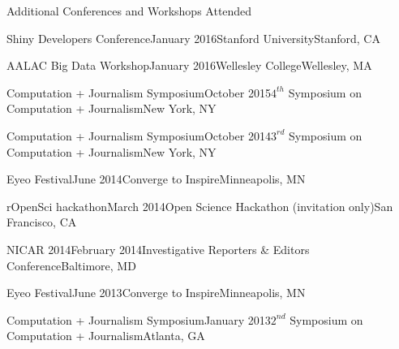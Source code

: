 \documentclass{resume} %
\begin{document}

\begin{rSection}{Additional Conferences and Workshops Attended}

\begin{sSubsection}{Shiny Developers Conference}{}{January 2016}{Stanford University}{Stanford, CA}
\end{sSubsection}

\begin{sSubsection}{AALAC Big Data Workshop}{}{January 2016}{Wellesley College}{Wellesley, MA}
\end{sSubsection}

\begin{sSubsection}{Computation + Journalism Symposium}{}{October 2015}{$4^{th}$ Symposium on Computation + Journalism}{New York, NY}
\end{sSubsection}

\begin{sSubsection}{Computation + Journalism Symposium}{}{October 2014}{$3^{rd}$ Symposium on Computation + Journalism}{New York, NY}
\end{sSubsection}

\begin{sSubsection}{Eyeo Festival}{}{June 2014}{Converge to Inspire}{Minneapolis, MN}
\end{sSubsection}

\begin{sSubsection}{rOpenSci hackathon}{}{March 2014}{Open Science Hackathon (invitation only)}{San Francisco, CA}
\end{sSubsection}

\begin{sSubsection}{NICAR 2014}{}{February 2014}{Investigative Reporters \& Editors Conference}{Baltimore, MD}
\end{sSubsection}

\begin{sSubsection}{Eyeo Festival}{}{June 2013}{Converge to Inspire}{Minneapolis, MN}
\end{sSubsection}

\begin{sSubsection}{Computation + Journalism Symposium}{}{January 2013}{$2^{nd}$ Symposium on Computation + Journalism}{Atlanta, GA}
\end{sSubsection}


\end{rSection}
\end{document}
